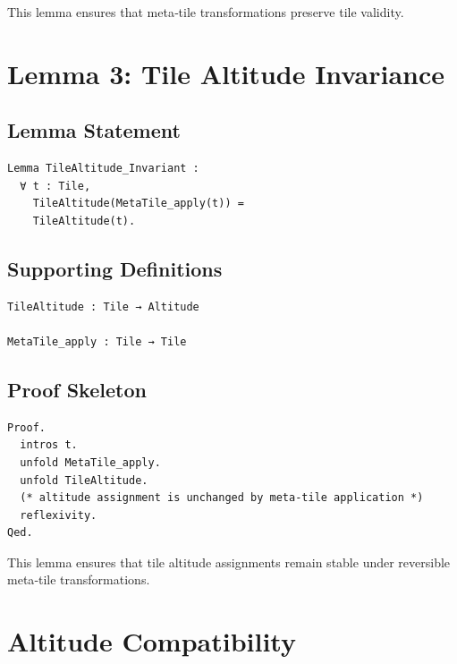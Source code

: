 \documentclass[11pt]{article}
\begin{document}
This lemma ensures that meta‑tile transformations preserve tile validity.

\newpage


\section{Lemma 3: Tile Altitude Invariance}

\subsection{Lemma Statement}

\begin{verbatim}
Lemma TileAltitude_Invariant :
  ∀ t : Tile,
    TileAltitude(MetaTile_apply(t)) =
    TileAltitude(t).
\end{verbatim}

\subsection{Supporting Definitions}

\begin{verbatim}
TileAltitude : Tile → Altitude

MetaTile_apply : Tile → Tile
\end{verbatim}

\subsection{Proof Skeleton}

\begin{verbatim}
Proof.
  intros t.
  unfold MetaTile_apply.
  unfold TileAltitude.
  (* altitude assignment is unchanged by meta-tile application *)
  reflexivity.
Qed.
\end{verbatim}

This lemma ensures that tile altitude assignments remain stable under reversible
meta‑tile transformations.

\newpage


\section{Altitude Compatibility}
\end{document}
